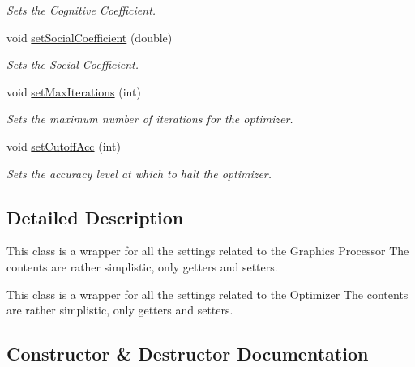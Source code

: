 \begin{DoxyCompactItemize}
\begin{DoxyCompactList}\small\item\em Sets the Cognitive Coefficient. \end{DoxyCompactList}\item 
void \hyperlink{class_optimizer_settings_package_aa45136551d680be4eca1f647c327e79f}{set\+Social\+Coefficient} (double)
\begin{DoxyCompactList}\small\item\em Sets the Social Coefficient. \end{DoxyCompactList}\item 
void \hyperlink{class_optimizer_settings_package_a09a53052a9146e9ccbf581ffc62d4cbc}{set\+Max\+Iterations} (int)
\begin{DoxyCompactList}\small\item\em Sets the maximum number of iterations for the optimizer. \end{DoxyCompactList}\item 
void \hyperlink{class_optimizer_settings_package_ac203e040df2778fb0f0ada6574c4894c}{set\+Cutoff\+Acc} (int)
\begin{DoxyCompactList}\small\item\em Sets the accuracy level at which to halt the optimizer. \end{DoxyCompactList}\end{DoxyCompactItemize}


\subsection{Detailed Description}
This class is a wrapper for all the settings related to the Graphics Processor The contents are rather simplistic, only getters and setters.

This class is a wrapper for all the settings related to the Optimizer The contents are rather simplistic, only getters and setters. 

\subsection{Constructor \& Destructor Documentation}
